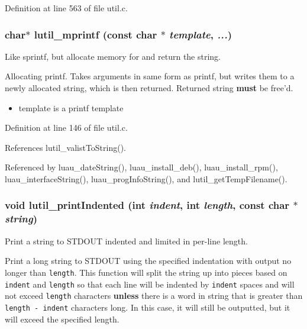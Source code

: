 Definition at line 563 of file util.c.
\subsubsection{\setlength{\rightskip}{0pt plus 5cm}char$\ast$ lutil\_\-mprintf (const char $\ast$ {\em template},  {\em ...})}\label{util_8c_a4}


Like sprintf, but allocate memory for and return the string. 

Allocating printf. Takes arguments in same form as printf, but writes them to a newly allocated string, which is then returned. Returned string {\bf must} be free'd.

\begin{itemize}
\item template is a printf template 
\end{itemize}


Definition at line 146 of file util.c.

References lutil\_\-valist\-To\-String().

Referenced by luau\_\-date\-String(), luau\_\-install\_\-deb(), luau\_\-install\_\-rpm(), luau\_\-interface\-String(), luau\_\-prog\-Info\-String(), and lutil\_\-get\-Temp\-Filename().
\subsubsection{\setlength{\rightskip}{0pt plus 5cm}void lutil\_\-print\-Indented (int {\em indent}, int {\em length}, const char $\ast$ {\em string})}\label{util_8c_a9}


Print a string to STDOUT indented and limited in per-line length. 

Print a long string to STDOUT using the specified indentation with output no longer than {\tt length}. This function will split the string up into pieces based on {\tt indent} and {\tt length} so that each line will be indented by {\tt indent} spaces and will not exceed {\tt length} characters {\bf unless} there is a word in string that is greater than {\tt length - indent} characters long. In this case, it will still be outputted, but it will exceed the specified length.

